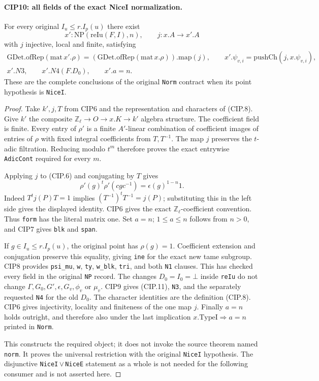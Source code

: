 \paragraph{CIP10: all fields of the exact NiceI normalization.}
\label{claim:CIP10}
For every original $I_u\le r.I_p(u)$ there exist
\[
 x':\mathrm{NP}(\mathrm{reIu}(F,I),n),\qquad
 j:x.A\longrightarrow x'.A
\]
with $j$ injective, local and finite, satisfying
\[
 \begin{gathered}
 \mathrm{GDet.ofRep}(\mathrm{mat}\,x'.\rho)
       =(\mathrm{GDet.ofRep}(\mathrm{mat}\,x.\rho)).\mathrm{map}(j),
 \qquad x'.\psi_{v,i}=\mathrm{pushCh}(j,x.\psi_{v,i}),\\
 x'.N3,\qquad x'.N4(F.D_0),\qquad x'.a=n.
 \end{gathered}                                      \tag{CIP.13}
\]
These are the complete conclusions of the original \texttt{Norm}
contract when its point hypothesis is \texttt{NiceI}.
\begin{proof}
Take $k',j,T$ from CIP6 and the representation and characters of
(CIP.8).  Give $k'$ the composite
$\mathbb Z_\ell\to O\to x.K\to k'$ algebra structure.
The coefficient field is finite.  Every entry of $\rho'$ is a
finite $A'$-linear combination of coefficient images of entries
of $\rho$ with fixed integral coefficients from $T,T^{-1}$.
The map $j$ preserves the $t$-adic filtration.  Reducing modulo
$t^m$ therefore proves the exact entrywise \texttt{AdicCont}
required for every $m$.

Applying $j$ to (CIP.6) and conjugating by $T$ gives
\[
 \rho'(g)^t\rho'(cgc^{-1})=\epsilon(g)^{1-n}1.
\]
Indeed $T^t j(P)T=1$ implies
$(T^{-1})^tT^{-1}=j(P)$; substituting this in the left side
gives the displayed identity.  CIP6 gives the exact
$\mathbb Z_\ell$-coefficient convention.  Thus \texttt{form}
has the literal matrix one.  Set $a=n$; $1\le a\le n$
follows from $n>0$, and CIP7 gives \texttt{blk} and \texttt{span}.

If $g\in I_u\le r.I_p(u)$, the original point has $\rho(g)=1$.
Coefficient extension and conjugation preserve this equality,
giving \texttt{ine} for the exact new tame subgroup.
CIP8 provides \texttt{psi\_mu}, \texttt{w}, \texttt{ty},
\texttt{w\_blk}, \texttt{tri}, and both \texttt{N1} clauses.
This has checked every field in the original \texttt{NP} record.
The changes $D_0=I_0=\bot$ inside \texttt{reIu} do not change
$\Gamma,G_0,G',\epsilon,G_v,\phi_v$ or $\mu_v$.
CIP9 gives (CIP.11), \texttt{N3}, and the separately requested
\texttt{N4} for the old $D_0$.  The character identities are the
definition (CIP.8).  CIP6 gives injectivity, locality and finiteness
of the one map $j$.  Finally $a=n$ holds outright, and therefore
also under the last implication $x.\mathrm{TypeI}\Rightarrow a=n$
printed in \texttt{Norm}.

This constructs the required object; it does not invoke the source
theorem named \texttt{norm}.  It proves the universal restriction
with the original \texttt{NiceI} hypothesis.  The disjunctive
\texttt{NiceI}\,$\vee$\,\texttt{NiceE} statement as a whole is
not needed for the following consumer and is not asserted here.
\end{proof}


